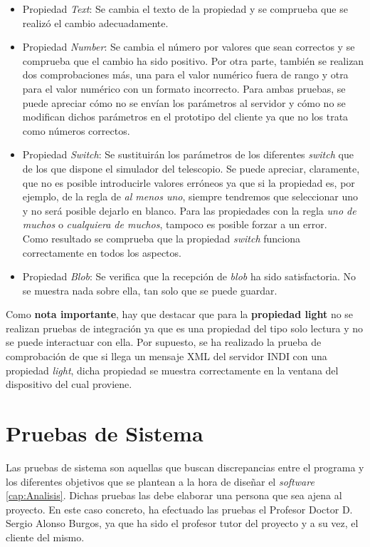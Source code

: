 \begin{itemize}
  \item Propiedad \textit{Text}: Se cambia el texto de la propiedad y se comprueba que se realizó el cambio adecuadamente.
  \item Propiedad \textit{Number}: Se cambia el número por valores que sean correctos y se comprueba que el cambio ha sido positivo. Por otra parte, también se realizan dos comprobaciones más, una para el valor numérico fuera de rango y otra para el valor numérico con un formato incorrecto. Para ambas pruebas, se puede apreciar cómo no se envían los parámetros al servidor y cómo no se modifican dichos parámetros en el prototipo del cliente ya que no los trata como números correctos.
  \item Propiedad \textit{Switch}: Se sustituirán los parámetros de los diferentes \textit{switch} que de los que dispone el simulador del telescopio. Se puede apreciar, claramente, que no es posible introducirle valores erróneos ya que si la propiedad es, por ejemplo, de la regla de \textit{al menos uno}, siempre tendremos que seleccionar uno y no será posible dejarlo en blanco. Para las propiedades con la regla \textit{uno de muchos} o \textit{cualquiera de muchos}, tampoco es posible forzar a un error.\\
  Como resultado se comprueba que la propiedad \textit{switch} funciona correctamente en todos los aspectos.
  \item Propiedad \textit{Blob}: Se verifica que la recepción de \textit{blob} ha sido satisfactoria. No se muestra nada sobre ella, tan solo que se puede guardar.
\end{itemize}

Como \textbf{nota importante}, hay que destacar que para la \textbf{propiedad light} no se realizan pruebas de integración ya que es una propiedad del tipo solo lectura y no se puede interactuar con ella. Por supuesto, se ha realizado la prueba de comprobación de que si llega un mensaje XML del servidor INDI con una propiedad \textit{light}, dicha propiedad se muestra correctamente en la ventana del dispositivo del cual proviene.

\section{Pruebas de Sistema}
Las pruebas de sistema son aquellas que buscan discrepancias entre el programa y los diferentes objetivos que se plantean a la hora de diseñar el \textit{software} \ref{cap:Analisis}.
Dichas pruebas las debe elaborar una persona que sea ajena al proyecto. En este caso concreto, ha efectuado las pruebas el Profesor Doctor  D. Sergio Alonso Burgos, ya que ha sido el profesor tutor del proyecto y a su vez, el cliente del mismo.\\

